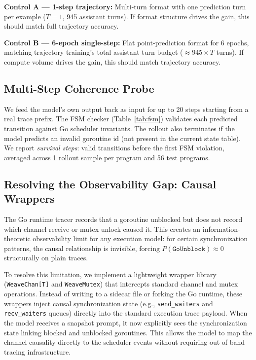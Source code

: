 \documentclass[10pt,conference]{IEEEtran}
\newcommand{\eunblock}{\texttt{GoUnblock}}
\begin{document}
\textbf{Control A — 1-step trajectory:} Multi-turn format with one
prediction turn per example ($T{=}1$, 945 assistant turns). If format structure drives the gain,
this should match full trajectory accuracy.

\textbf{Control B — 6-epoch single-step:} Flat point-prediction format
for 6 epochs, matching trajectory training's total assistant-turn
budget (${\approx}945{\times}T$ turns). If compute volume drives the gain, this should match
trajectory accuracy.

\subsection{Multi-Step Coherence Probe}\label{sec:rollout}

We feed the model's own output back as input for up to 20 steps
starting from a real trace prefix.
The FSM checker (Table~\ref{tab:fsm}) validates each predicted
transition against Go scheduler invariants.
The rollout also terminates if the model predicts an invalid goroutine
id (not present in the current state table).
We report \emph{survival steps}: valid transitions before the first
FSM violation, averaged across 1 rollout sample per program and
56 test programs.

\subsection{Resolving the Observability Gap: Causal Wrappers}\label{sec:wrappers}

The Go runtime tracer records that a goroutine unblocked but does not record which channel receive or mutex unlock caused it. This creates an information-theoretic observability limit for any execution model: for certain synchronization patterns, the causal relationship is invisible, forcing $P(\eunblock) \approx 0$ structurally on plain traces. 

To resolve this limitation, we implement a lightweight wrapper library (\texttt{WeaveChan[T]} and \texttt{WeaveMutex}) that intercepts standard channel and mutex operations. Instead of writing to a sidecar file or forking the Go runtime, these wrappers inject causal synchronization state (e.g., \texttt{send\_waiters} and \texttt{recv\_waiters} queues) directly into the standard execution trace payload. When the model receives a snapshot prompt, it now explicitly sees the synchronization state linking blocked and unblocked goroutines. This allows the model to map the channel causality directly to the scheduler events without requiring out-of-band tracing infrastructure.
\end{document}
